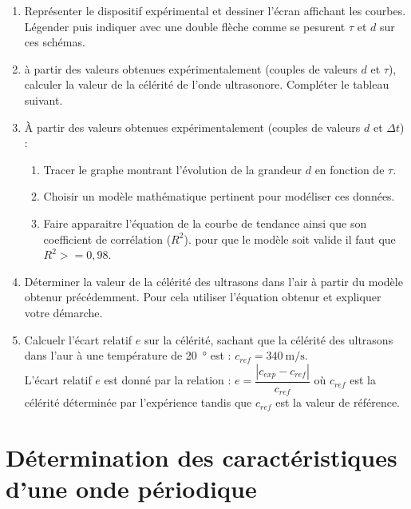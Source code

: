 \documentclass[a4paper,11pt,fleqn]{scrartcl}%
\begin{document}
\begin{enumerate}
    \item Représenter le dispositif expérimental et dessiner l'écran  affichant les courbes. Légender puis indiquer avec une double flèche comme se pesurent $\tau$ et $d$ sur ces schémas.
    \item à partir des valeurs obtenues expérimentalement (couples de valeurs $d$ et $\tau$), calculer la valeur de la célérité de l'onde ultrasonore. Compléter le tableau suivant.
    \item À partir des valeurs obtenues expérimentalement (couples de valeurs $d$ et $\Delta t$) : \begin{enumerate}
        \item Tracer le graphe montrant l'évolution de la grandeur $d$ en fonction de $\tau$.
        \item Choisir un modèle mathématique pertinent pour modéliser ces données.
        \item Faire apparaitre l'équation de la courbe de tendance ainsi que son coefficient de corrélation ($R^2$). pour que le modèle soit valide il faut que $R^2>=0,98$.
    \end{enumerate}
    \item Déterminer la valeur de la célérité des ultrasons dans l'air à partir du modèle obtenur précédemment. Pour cela utiliser l'équation obtenur et expliquer votre démarche.
    \item Calcuelr l'écart relatif $e$ sur la célérité, sachant que la célérité des ultrasons dans l'aur à une température de \SI{20}{\degree} est : $c_{ref} = \SI{340}{\meter\per\second}$. \\
    L'écart relatif $e$ est donné par la relation : $e =\dfrac{|c_{exp} - c_{ref}|}{c_{ref}}$ où $c_{ref}$ est la célérité déterminée par l'expérience tandis que $c_{ref}$ est la valeur de référence.
\end{enumerate}

\section{Détermination des caractéristiques d'une onde périodique}
\end{document}
